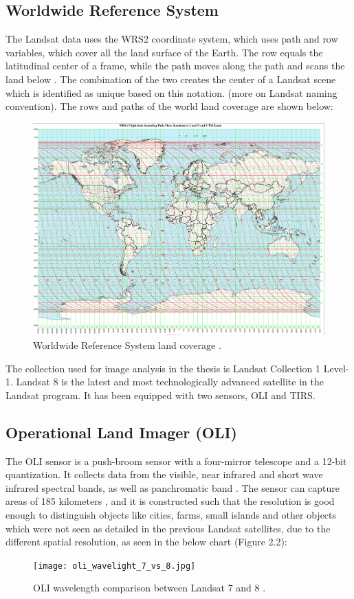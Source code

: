 \documentclass[12pt, a4paper]{report}
\begin{document}
	\subsection{Worldwide Reference System}
	The Landsat data uses the WRS2 coordinate system, which uses path and row variables, which cover all the land surface of the Earth. The row equals the latitudinal center of a frame, while the path moves along the path and scans the land below \cite{wrs2}. The combination of the two creates the center of a Landsat scene which is identified as unique based on this notation. (more on Landsat naming convention). The rows and paths of the world land coverage are shown below:
	\begin{figure}[h]
		\centering
		\includegraphics[scale=1]{worldwide_reference.png}
		\caption{Worldwide Reference System land coverage \cite{wrs2}.}
		\label{fig:wrs2_path_row}
	\end{figure}
	
	The collection used for image analysis in the thesis is Landsat Collection 1 Level-1.
	Landsat 8 is the latest and most technologically advanced satellite in the Landsat program. It has been equipped with two sensors, OLI and TIRS.
	
	\subsection{Operational Land Imager (OLI)}
	The OLI sensor is a push-broom sensor with a four-mirror telescope and a 12-bit quantization. It collects data from the visible, near infrared and short wave infrared spectral bands, as well as panchromatic band \cite{wavelength}. The sensor can capture areas of 185 kilometers \cite{oli}, and it is constructed such that the resolution is good enough to distinguish objects like cities, farms, small islands and other objects which were not seen as detailed in the previous Landsat satellites, due to the different spatial resolution, as seen in the below chart (Figure 2.2):
	\begin{figure}[h!]
		\centering
		\texttt{[image: oli\_wavelight\_7\_vs\_8.jpg]}
		\caption{OLI wavelength comparison between Landsat 7 and 8 \cite{wavelength}.}
		\label{fig:wavelength_comparison}
	\end{figure}
	
\end{document}
